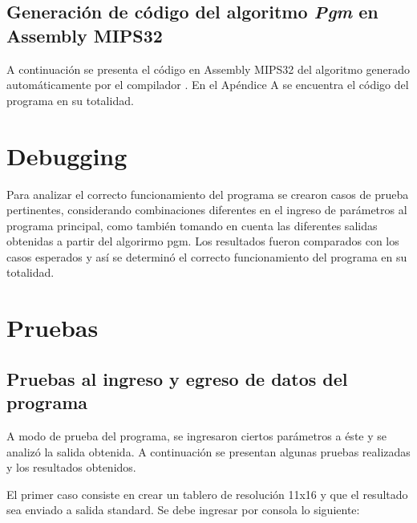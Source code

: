 \documentclass{article}
\begin{document}
\lstset{ language = C } %
 
\bigskip\bigskip



\newpage
\subsection{Generación de código del algoritmo \textit{Pgm} en Assembly MIPS32}

	A continuación se presenta el código en Assembly MIPS32 del algoritmo  generado automáticamente por el compilador . En el Apéndice A se encuentra el código del programa en su totalidad.
	\medskip

\lstset{ language = [mips]Assembler } %
 
\bigskip\bigskip


\section{Debugging}
	
	Para analizar el correcto funcionamiento del programa se crearon casos de prueba pertinentes, considerando combinaciones diferentes en el ingreso de parámetros al programa principal, como también tomando en cuenta las diferentes salidas obtenidas a partir del algorirmo pgm. Los resultados fueron comparados con los casos esperados y así se determinó el correcto funcionamiento del programa en su totalidad.
\bigskip




\section{Pruebas}

\subsection{Pruebas al ingreso y egreso de datos del programa}

	A modo de prueba del programa, se ingresaron ciertos parámetros a éste y se analizó la salida obtenida. A continuación se presentan algunas pruebas realizadas y los resultados obtenidos.
	\par
	El primer caso consiste en crear un tablero de resolución 11x16 y que el resultado sea enviado a salida standard. Se debe ingresar por consola lo siguiente:
	\smallskip
\end{document}
